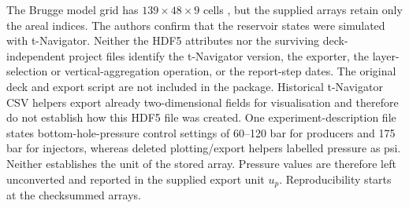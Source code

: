 The Brugge model grid has $139\times48\times9$ cells \cite{peters2010brugge}, but the supplied arrays retain only the areal indices. The authors confirm that the reservoir states were simulated with t-Navigator. Neither the HDF5 attributes nor the surviving deck-independent project files identify the t-Navigator version, the exporter, the layer-selection or vertical-aggregation operation, or the report-step dates. The original deck and export script are not included in the package. Historical t-Navigator CSV helpers export already two-dimensional fields for visualisation and therefore do not establish how this HDF5 file was created. One experiment-description file states bottom-hole-pressure control settings of 60--120 bar for producers and 175 bar for injectors, whereas deleted plotting/export helpers labelled pressure as psi. Neither establishes the unit of the stored array. Pressure values are therefore left unconverted and reported in the supplied export unit $u_p$. Reproducibility starts at the checksummed arrays.
